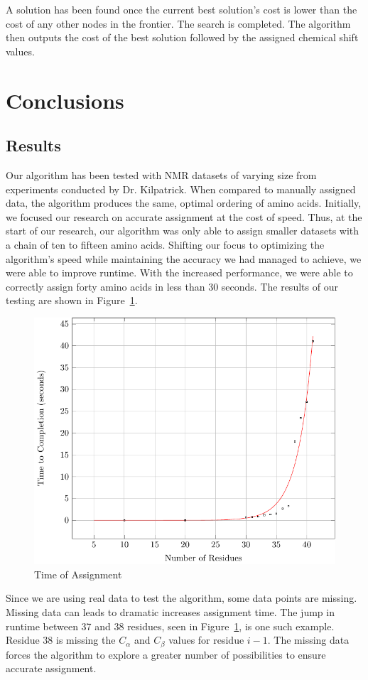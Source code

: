 \documentclass[12pt, letter]{article}
\begin{document}
A solution has been found once the current best solution's cost is lower than the cost of any other nodes in the frontier. The search is completed. The algorithm then outputs the cost of the best solution followed by the assigned chemical shift values. 

\section{Conclusions}
\label{sec:conclusions}

\subsection{Results}
\label{sub:results}
Our algorithm has been tested with NMR datasets of varying size from experiments conducted by Dr. Kilpatrick.  When compared to manually assigned data, the algorithm produces the same, optimal ordering of amino acids. Initially, we focused our research on accurate assignment at the cost of speed. Thus, at the start of our research, our algorithm was only able to assign smaller datasets with a chain of ten to fifteen amino acids. Shifting our focus to optimizing the algorithm's speed while maintaining the accuracy we had managed to achieve, we were able to improve runtime. With the increased performance, we were able to correctly assign forty amino acids in less than 30 seconds. The results of our testing are shown in Figure~\ref{fig:plot}.

\begin{figure}[H]
\begin{center}
\includegraphics[width=.65\textwidth]{plot}
\end{center}
\caption{Time of Assignment} 
\label{fig:plot}
\end{figure}

Since we are using real data to test the algorithm, some data points are missing. Missing data can leads to dramatic increases assignment time. The jump in runtime between 37 and 38 residues, seen in Figure~\ref{fig:plot}, is one such example. Residue 38 is missing the $C_\alpha$ and $C_{\beta}$ values for residue $i-1$. The missing data forces the algorithm to explore a greater number of possibilities to ensure accurate assignment. 
\end{document}
